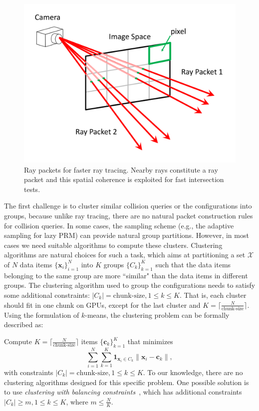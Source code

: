 \begin{figure}[htb]
  \centering
  \includegraphics[width=\linewidth]{figs/5/raypacket.pdf}
  \caption[Ray packets for faster GPU-based ray tracing]{Ray packets for faster ray tracing. Nearby rays constitute a ray packet and this spatial coherence is
  exploited for fast intersection tests.}
  \label{fig:5:raypacket}
\end{figure}

The first challenge is to cluster similar collision queries or the configurations into groups, because unlike
ray tracing, there are no natural packet construction rules for collision queries. In some cases, the sampling scheme (e.g., the adaptive sampling for lazy PRM) can provide natural group partitions. However, in most cases
we need suitable algorithms to compute these clusters. Clustering algorithms are natural choices for such a task, which aims
at partitioning a set $\mathcal{X}$ of $N$ data items $\{\mathbf{x}_i\}_{i=1}^N$ into $K$ groups $\{C_k\}_{k=1}^K$ such that the data items belonging to the same group are more ``similar" than the data items in different groups. The clustering algorithm
used to group the configurations needs to satisfy some additional constraints: $|C_k| = \text{chunk-size}, 1\leq k \leq K$. That is, each cluster should fit in one chunk on GPUs, except for the last cluster and $K = \lceil \frac{N}{\text{chunk-size}} \rceil$. Using the formulation of $k$-means, the clustering problem can be formally described as:

\noindent Compute $K = \lceil \frac{N}{\text{chunk-size}} \rceil$ items $\{\mathbf{c}_k\}_{k=1}^K$ that minimizes
\begin{equation}
\label{eq:5:cluster}
\sum_{i=1}^N\sum_{k=1}^K \mathbf{1}_{\mathbf{x}_i \in C_k} \|\mathbf{x}_i - \mathbf{c}_k\|,
\end{equation}
with constraints $|C_k| = \text{chunk-size}, 1\leq k \leq K$. To our knowledge, there are no clustering algorithms designed
for this specific problem. One possible solution is to use \emph{clustering with balancing constraints}~\cite{Banerjee:2006},
which has additional constraints $|C_k| \geq m, 1\leq k \leq K$, where $m \leq \frac{N}{K}$.

